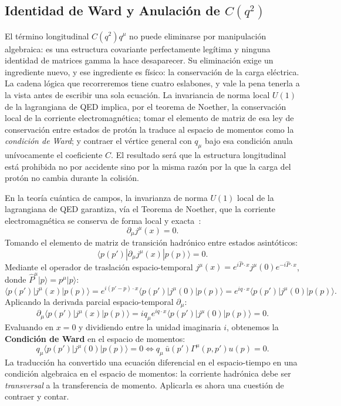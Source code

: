 \documentclass[10pt,a4paper]{article}
\begin{document}
\subsection{Identidad de Ward y Anulación de \texorpdfstring{$C(q^2)$}{C(q\^2)}}
El término longitudinal $C(q^2)q^\mu$ no puede eliminarse por manipulación algebraica: es una estructura covariante perfectamente legítima y ninguna identidad de matrices gamma la hace desaparecer. Su eliminación exige un ingrediente nuevo, y ese ingrediente es físico: la conservación de la carga eléctrica. La cadena lógica que recorreremos tiene cuatro eslabones, y vale la pena tenerla a la vista antes de escribir una sola ecuación. La invariancia de norma local $U(1)$ de la lagrangiana de QED implica, por el teorema de Noether, la conservación local de la corriente electromagnética; tomar el elemento de matriz de esa ley de conservación entre estados de protón la traduce al espacio de momentos como la \emph{condición de Ward}; y contraer el vértice general con $q_\mu$ bajo esa condición anula unívocamente el coeficiente $C$. El resultado será que la estructura longitudinal está prohibida no por accidente sino por la misma razón por la que la carga del protón no cambia durante la colisión.

En la teoría cuántica de campos, la invarianza de norma $U(1)$ local de la lagrangiana de QED garantiza, vía el Teorema de Noether, que la corriente electromagnética se conserva de forma local y exacta~\cite{ward1950,thomson2013}:
\begin{equation}
\partial_\mu j^\mu(x) = 0.
\end{equation}
Tomando el elemento de matriz de transición hadrónico entre estados asintóticos:
\begin{equation}
\langle p(p') | \partial_\mu j^\mu(x) | p(p) \rangle = 0.
\end{equation}
Mediante el operador de traslación espacio-temporal $j^\mu(x) = e^{i \hat{P} \cdot x} j^\mu(0) e^{-i \hat{P} \cdot x}$, donde $\hat{P}^\mu |p\rangle = p^\mu |p\rangle$:
\begin{equation}
\langle p(p') | j^\mu(x) | p(p) \rangle = e^{i(p' - p) \cdot x} \langle p(p') | j^\mu(0) | p(p) \rangle = e^{i q \cdot x} \langle p(p') | j^\mu(0) | p(p) \rangle.
\end{equation}
Aplicando la derivada parcial espacio-temporal $\partial_\mu$:
\begin{equation}
\partial_\mu \langle p(p') | j^\mu(x) | p(p) \rangle = i q_\mu e^{i q \cdot x} \langle p(p') | j^\mu(0) | p(p) \rangle = 0.
\end{equation}
Evaluando en $x=0$ y dividiendo entre la unidad imaginaria $i$, obtenemos la \textbf{Condición de Ward} en el espacio de momentos:
\begin{equation}
q_\mu \langle p(p') | j^\mu(0) | p(p) \rangle = 0 \iff q_\mu \, \bar{u}(p') \Gamma^\mu(p, p') u(p) = 0.
\label{eq:ward_condition}
\end{equation}
La traducción ha convertido una ecuación diferencial en el espacio-tiempo en una condición algebraica en el espacio de momentos: la corriente hadrónica debe ser \emph{transversal} a la transferencia de momento. Aplicarla es ahora una cuestión de contraer y contar.
\end{document}
